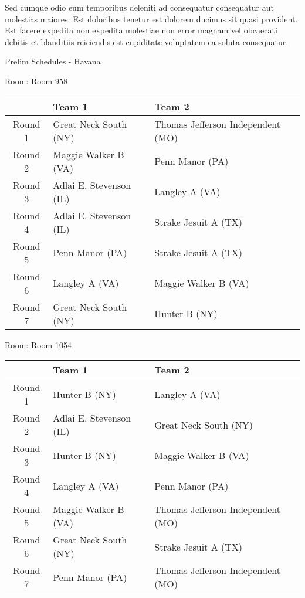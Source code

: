 \documentclass{article}%
\begin{document}
\newline%
Sed cumque odio eum temporibus deleniti ad consequatur consequatur aut molestias maiores. Est doloribus tenetur est dolorem ducimus sit quasi provident. Est facere expedita non expedita molestiae non error magnam vel obcaecati debitis et blanditiis reiciendis est cupiditate voluptatem ea soluta consequatur.%
\newpage%
\begin{center}%
\begin{Huge}%
Prelim Schedules {-} Havana%
\end{Huge}%
\end{center}%
\begin{flushleft}%
\begin{Large}%
Room: Room 958%
\end{Large}%
\end{flushleft}%
\begin{tabularx}{\textwidth}{|c|Y|Y|}%
\hline%
&Team 1&Team 2\\%
\hline%
Round 1&Great Neck South (NY)&Thomas Jefferson Independent (MO)\\%
Round 2&Maggie Walker B (VA)&Penn Manor (PA)\\%
Round 3&Adlai E. Stevenson (IL)&Langley A (VA)\\%
Round 4&Adlai E. Stevenson (IL)&Strake Jesuit A (TX)\\%
Round 5&Penn Manor (PA)&Strake Jesuit A (TX)\\%
Round 6&Langley A (VA)&Maggie Walker B (VA)\\%
Round 7&Great Neck South (NY)&Hunter B (NY)\\%
\hline%
\end{tabularx}%
\vspace*{8pt}%
\linebreak%
\begin{flushleft}%
\begin{Large}%
Room: Room 1054%
\end{Large}%
\end{flushleft}%
\begin{tabularx}{\textwidth}{|c|Y|Y|}%
\hline%
&Team 1&Team 2\\%
\hline%
Round 1&Hunter B (NY)&Langley A (VA)\\%
Round 2&Adlai E. Stevenson (IL)&Great Neck South (NY)\\%
Round 3&Hunter B (NY)&Maggie Walker B (VA)\\%
Round 4&Langley A (VA)&Penn Manor (PA)\\%
Round 5&Maggie Walker B (VA)&Thomas Jefferson Independent (MO)\\%
Round 6&Great Neck South (NY)&Strake Jesuit A (TX)\\%
Round 7&Penn Manor (PA)&Thomas Jefferson Independent (MO)\\%
\hline%
\end{tabularx}%
\end{document}

